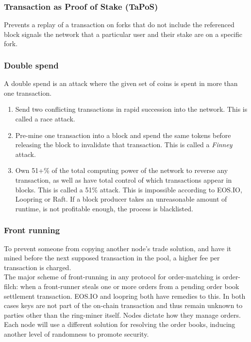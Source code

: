 \documentclass[]{article}
\begin{document}
		\subsubsection{Transaction as Proof of Stake (TaPoS)}
			Prevents a replay of a transaction on forks that do not include the referenced block signals the network that a particular user and their stake are on a specific fork.
		\subsubsection{Double spend}
		A double spend is an attack where the given set of coins is spent in more than one transaction.
		\begin{enumerate}
			\item Send two conflicting transactions in rapid succession into the network. This is called a race attack. 
			\item Pre-mine one transaction into a block and spend the same tokens before releasing the block to invalidate that transaction. This is called a \textit{Finney} attack.
			\item Own 51+\% of the total computing power of the network to reverse any transaction, as well as have total control of which transactions appear in blocks. This is called a 51\% attack.
			This is impossible according to EOS.IO, Loopring or Raft.
			If a block producer takes an unreasonable amount of runtime, is not profitable enough, the process is blacklisted.
		\end{enumerate} 

		\subsubsection{Front running}
		To prevent someone from copying another node's trade solution, 
		and have it mined before the next supposed transaction in the pool, 
		a higher fee per transaction is charged.\\ 
		The major scheme of front-running in any protocol for
		order-matching is order-filch: when a front-runner steals
		one or more orders from a pending order book settlement
		transaction. EOS.IO and loopring both have remedies to this.
		In both cases keys are not part of the on-chain transaction and thus remain unknown
		to parties other than the ring-miner itself.
		Nodes dictate how they manage orders.
		Each node will use a different solution for resolving the order books, inducing another level of randomness to promote security.
			
\end{document}
